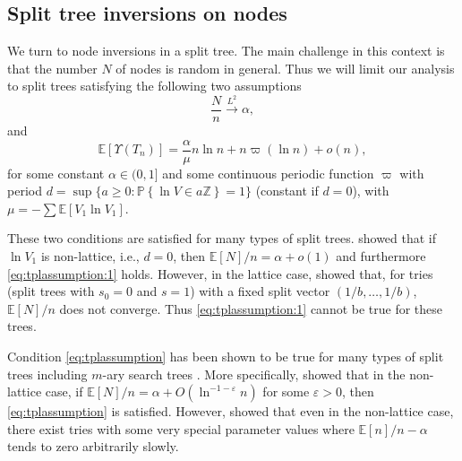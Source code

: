 \documentclass[11pt]{article}
\newcommand{\E}[1]{\mathbb{E} \left[#1\right]}
\def\Z{\mathbb{Z}}
\def\U{\Upsilon}
\def\a{\alpha}
\def\m{\mu}
\newcommand\Prob[1]{{\mathbb{P}\left\{#1\right\}}}
\numberwithin{theorem}{section}
\theoremstyle{definition}
\newcommand{\inLII}{\overset{L^{2}}{\too}}
\numberwithin{equation}{section}
\newcommand{\too}{\longrightarrow}
\begin{document}
\subsection{Split tree inversions on nodes}\label{sec:splitnodes}

We turn to node inversions in a split tree. The main challenge in this context is that the number
$N$ of nodes is random in general. Thus we will limit our analysis to split trees satisfying 
the following two assumptions
\begin{equation}
    \frac{N}{n} \inLII \alpha,
    \label{eq:tplassumption:1}
\end{equation}
and
\begin{equation}
    \E{\U(T_n)} = \frac{\a}{\m}n\ln n + n\varpi(\ln n) + o(n),
    \label{eq:tplassumption}
\end{equation}
for some  constant $\a \in (0, 1]$ and some continuous periodic function $\varpi$ with period $d = \sup\{a \geq 0 : \Prob{\ln V\in a\Z}=1\}$ (constant if
$d = 0$), with $\m = -\sum \E{V_1\ln V_1}$.

These two conditions are satisfied for many types of split trees. \citet{MR2878784} showed that if
\(\ln V_{1}\) is non-lattice, i.e., \(d=0\), then \(\E{N}/n = \alpha + o(1)\) and furthermore
\eqref{eq:tplassumption:1} holds. However, in the lattice case, \citet{MR995343} showed that, for
tries (split trees with \(s_0=0\) and \(s=1\)) with a fixed split vector \( (1/b,\dots,1/b)\),
\(\E{N}/n\) does not converge. Thus \eqref{eq:tplassumption:1} cannot be true for these trees.

Condition \eqref{eq:tplassumption} has been shown to be true for many types of split trees
including \(m\)-ary search trees \cite{MR905782, MR2035872, MR2504401, MR987097}. More specifically,
\citet{MR3025680} showed that in the non-lattice case, if \(\E{N}/n = \alpha + O(\ln^{-1-\varepsilon}
    n)\) for some \(\varepsilon > 0\), then \eqref{eq:tplassumption} is satisfied. However,
\citet{MR2735344} showed that even in the non-lattice case, there exist 
tries with some very special parameter values where \(\E{n}/n - \alpha\) tends to zero arbitrarily
slowly.
\end{document}
